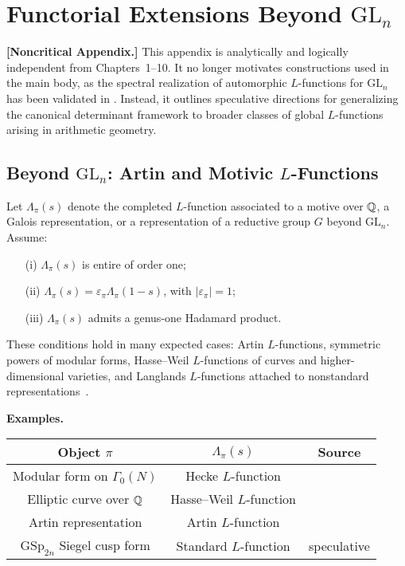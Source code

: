 \section{Functorial Extensions Beyond \texorpdfstring{$\mathrm{GL}_n$}{GLn}}
\label{app:functorial_extensions}

\noindent\textbf{[Noncritical Appendix.]}  
This appendix is analytically and logically independent from Chapters~1–10. It no longer motivates constructions used in the main body, as the spectral realization of automorphic \( L \)-functions for \( \mathrm{GL}_n \) has been validated in . Instead, it outlines speculative directions for generalizing the canonical determinant framework to broader classes of global \( L \)-functions arising in arithmetic geometry.

\subsection*{Beyond \texorpdfstring{$\mathrm{GL}_n$}{GLn}: Artin and Motivic \texorpdfstring{$L$}{L}-Functions}

Let \( \Lambda_\pi(s) \) denote the completed \( L \)-function associated to a motive over \( \mathbb{Q} \), a Galois representation, or a representation of a reductive group \( G \) beyond \( \mathrm{GL}_n \). Assume:
\begin{itemize}
  \item[(i)] \( \Lambda_\pi(s) \) is entire of order one;
  \item[(ii)] \( \Lambda_\pi(s) = \varepsilon_\pi \Lambda_\pi(1 - s) \), with \( |\varepsilon_\pi| = 1 \);
  \item[(iii)] \( \Lambda_\pi(s) \) admits a genus-one Hadamard product.
\end{itemize}

These conditions hold in many expected cases: Artin \( L \)-functions, symmetric powers of modular forms, Hasse–Weil \( L \)-functions of curves and higher-dimensional varieties, and Langlands \( L \)-functions attached to nonstandard representations~\cite{Langlands1970EulerProducts, Deligne1971WeilI}.

\medskip
\noindent\textbf{Examples.}
\begin{center}
\renewcommand{\arraystretch}{1.3}
\begin{tabular}{|c|c|c|}
\hline
\textbf{Object \( \pi \)} & \textbf{\( \Lambda_\pi(s) \)} & \textbf{Source} \\
\hline
Modular form on \( \Gamma_0(N) \) & Hecke \( L \)-function & \cite{Cogdell2007Lectures} \\
Elliptic curve over \( \mathbb{Q} \) & Hasse–Weil \( L \)-function & \cite{Deligne1971WeilI} \\
Artin representation & Artin \( L \)-function & \cite{Langlands1970EulerProducts} \\
\( \mathrm{GSp}_{2n} \) Siegel cusp form & Standard \( L \)-function & speculative \\
\hline
\end{tabular}
\end{center}

